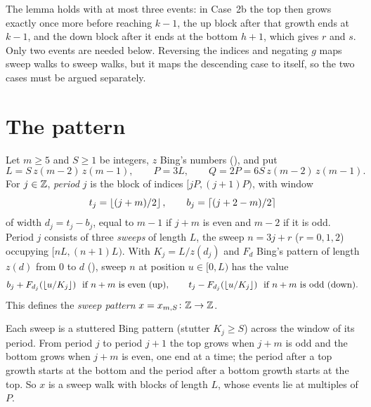 
\begin{remark}
The lemma holds with at most three events: in Case~2b the top then grows exactly once more before reaching $k-1$, the up block after that growth ends at $k-1$, and the down block after
it ends at the bottom $h+1$, which gives $r$ and $s$. Only two events are needed below. Reversing the indices and negating $g$ maps sweep walks to sweep walks, but it maps the
descending case to itself, so the two cases must be argued separately.
\end{remark}


\section{The pattern}

\begin{definition}\label{def:sweepX}
Let $m\ge5$ and $S\ge1$ be integers, $z$ Bing's numbers (), and put
\[
L=S\,z(m-2)\,z(m-1),\qquad P=3L,\qquad Q=2P=6S\,z(m-2)\,z(m-1).
\]
For $j\in\mathbb{Z}$, \emph{period $j$} is the block of indices $[jP,(j+1)P)$, with window
\[
t_j=\left\lfloor (j+m)/2\right\rfloor,\qquad b_j=\left\lceil (j+2-m)/2\right\rceil
\]
of width $d_j=t_j-b_j$, equal to $m-1$ if $j+m$ is even and $m-2$ if it is odd. Period $j$ consists of three \emph{sweeps} of length $L$, the sweep $n=3j+r$ ($r=0,1,2$) occupying
$[nL,(n+1)L)$. With $K_j=L/z(d_j)$ and $F_d$ Bing's pattern of length $z(d)$ from $0$ to $d$ (), sweep $n$ at position $u\in[0,L)$ has the value
\[
b_j+F_{d_j}(\fl{u/K_j})\ \text{ if $n+m$ is even (up)},\qquad t_j-F_{d_j}(\fl{u/K_j})\ \text{ if $n+m$ is odd (down)}.
\]
This defines the \emph{sweep pattern} $x=x_{m,S}\colon\mathbb{Z}\to\mathbb{Z}$.
\end{definition}


Each sweep is a stuttered Bing pattern (stutter $K_j\ge S$) across the window of its period. From period $j$ to period $j+1$ the top grows when $j+m$ is odd and the bottom grows when $j+m$ is
even, one end at a time; the period after a top growth starts at the bottom and the period after a bottom growth starts at the top. So $x$ is a sweep walk with blocks of length $L$, whose events lie
at multiples of $P$.

